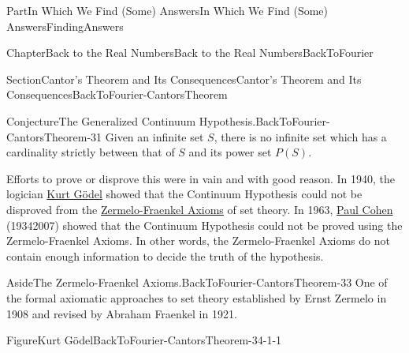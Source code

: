 \documentclass[oneside,10pt,]{book}
\numberwithin{equation}{part}
\begin{document}
\begin{partptx}{Part}{In Which We Find (Some) Answers}{}{In Which We Find (Some) Answers}{}{}{FindingAnswers}
\begin{chapterptx}{Chapter}{Back to the Real Numbers}{}{Back to the Real Numbers}{}{}{BackToFourier}
\begin{sectionptx}{Section}{Cantor's Theorem and Its Consequences}{}{Cantor's Theorem and Its Consequences}{}{}{BackToFourier-CantorsTheorem}
\begin{conjecture}{Conjecture}{The Generalized Continuum Hypothesis.}{}{BackToFourier-CantorsTheorem-31}
%
Given an infinite set \(S\), there is no infinite set which has a cardinality strictly between that of \(S\) and its power set \(P(S)\).%
\end{conjecture}
Efforts to prove or disprove this were in vain and with good reason.  In 1940, the logician         \href{https://mathshistory.st-andrews.ac.uk/Biographies/Godel/}{Kurt Gödel} showed that the Continuum Hypothesis could not be disproved from the \href{https://en.wikipedia.org/wiki/Zermelo\%E2\%80\%93Fraenkel_set_theory}{Zermelo-Fraenkel Axioms} of set theory.  In 1963, \href{https://mathshistory.st-andrews.ac.uk/Biographies/Cohen/}{Paul Cohen} (1934\textendash{}2007) showed that the Continuum Hypothesis could not be proved using the Zermelo-Fraenkel Axioms.  In other words, the Zermelo-Fraenkel Axioms do not contain enough information to decide the truth of the hypothesis.%
\begin{aside}{Aside}{The Zermelo-Fraenkel Axioms.}{BackToFourier-CantorsTheorem-33}%
One of the formal axiomatic approaches to set theory established by Ernst Zermelo in 1908 and revised by Abraham Fraenkel in 1921.%
\end{aside}
\begin{sidebyside}{2}{0.075}{0.075}{0.15}%
\begin{sbspanel}{0.35}%
\begin{panelfigureptx}{Figure}{Kurt Gödel}{BackToFourier-CantorsTheorem-34-1-1}{}%
%
%

\end{panelfigureptx}
\end{sbspanel}
\end{sidebyside}
\end{sectionptx}
\end{chapterptx}
\end{partptx}
\end{document}
